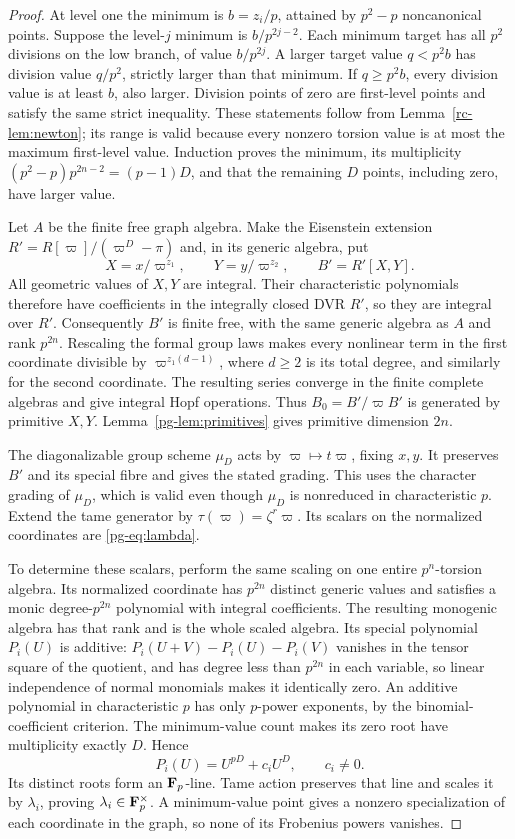 \begin{proof}
At level one the minimum is $b=z_i/p$, attained by $p^2-p$ noncanonical points. Suppose the level-$j$ minimum is $b/p^{2j-2}$. Each minimum target has all $p^2$ divisions on the low branch, of value $b/p^{2j}$. A larger target value $q<p^2b$ has division value $q/p^2$, strictly larger than that minimum. If $q\ge p^2b$, every division value is at least $b$, also larger. Division points of zero are first-level points and satisfy the same strict inequality. These statements follow from Lemma~\ref{rc-lem:newton}; its range is valid because every nonzero torsion value is at most the maximum first-level value. Induction proves the minimum, its multiplicity $(p^2-p)p^{2n-2}=(p-1)D$, and that the remaining $D$ points, including zero, have larger value.

Let $A$ be the finite free graph algebra. Make the Eisenstein extension $R'=R[\varpi]/(\varpi^D-\pi)$ and, in its generic algebra, put
\[
 X=x/\varpi^{z_1},\qquad Y=y/\varpi^{z_2},\qquad B'=R'[X,Y].
\]
All geometric values of $X,Y$ are integral. Their characteristic polynomials therefore have coefficients in the integrally closed DVR $R'$, so they are integral over $R'$. Consequently $B'$ is finite free, with the same generic algebra as $A$ and rank $p^{2n}$. Rescaling the formal group laws makes every nonlinear term in the first coordinate divisible by $\varpi^{z_1(d-1)}$, where $d\ge2$ is its total degree, and similarly for the second coordinate. The resulting series converge in the finite complete algebras and give integral Hopf operations. Thus $B_0=B'/\varpi B'$ is generated by primitive $X,Y$. Lemma~\ref{pg-lem:primitives} gives primitive dimension $2n$.

The diagonalizable group scheme $\mu_D$ acts by $\varpi\mapsto t\varpi$, fixing $x,y$. It preserves $B'$ and its special fibre and gives the stated grading. This uses the character grading of $\mu_D$, which is valid even though $\mu_D$ is nonreduced in characteristic $p$. Extend the tame generator by $\tau(\varpi)=\zeta^r\varpi$. Its scalars on the normalized coordinates are \eqref{pg-eq:lambda}.

To determine these scalars, perform the same scaling on one entire $p^n$-torsion algebra. Its normalized coordinate has $p^{2n}$ distinct generic values and satisfies a monic degree-$p^{2n}$ polynomial with integral coefficients. The resulting monogenic algebra has that rank and is the whole scaled algebra. Its special polynomial $P_i(U)$ is additive: $P_i(U+V)-P_i(U)-P_i(V)$ vanishes in the tensor square of the quotient, and has degree less than $p^{2n}$ in each variable, so linear independence of normal monomials makes it identically zero. An additive polynomial in characteristic $p$ has only $p$-power exponents, by the binomial-coefficient criterion. The minimum-value count makes its zero root have multiplicity exactly $D$. Hence
\[
 P_i(U)=U^{pD}+c_iU^D,\qquad c_i\ne0.
\]
Its distinct roots form an $\mathbf F_p$-line. Tame action preserves that line and scales it by $\lambda_i$, proving $\lambda_i\in\mathbf F_p^\times$. A minimum-value point gives a nonzero specialization of each coordinate in the graph, so none of its Frobenius powers vanishes.


\end{proof}
